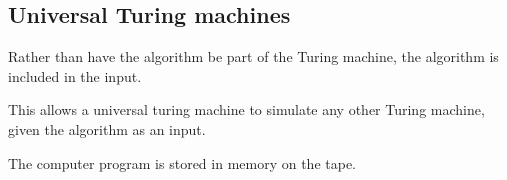 
\subsection{Universal Turing machines}

Rather than have the algorithm be part of the Turing machine, the algorithm is included in the input.

This allows a universal turing machine to simulate any other Turing machine, given the algorithm as an input.

The computer program is stored in memory on the tape.


